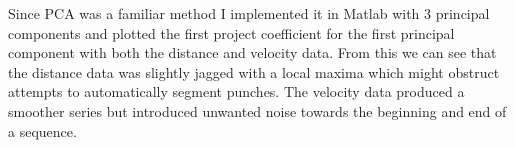 \begin{figure}[h]
\centering
\begin{minipage}{6.0cm}
    \centering
    \label{fig:1}
\end{minipage}
\begin{minipage}{6.0cm}
    \centering
    \label{fig:2}
\end{minipage}
\end{figure}

Since PCA was a familiar method I implemented it in Matlab with 3 principal components and plotted the first project coefficient for the first principal component with both the distance and velocity data. From this we can see that the distance data was slightly jagged with a local maxima which might obstruct attempts to automatically segment punches. The velocity data produced a smoother series but introduced unwanted noise towards the beginning and end of a sequence.

